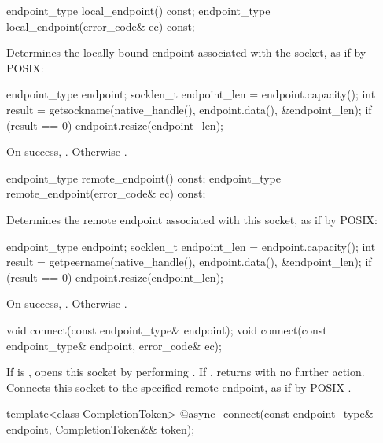 \begin{itemdecl}
endpoint_type local_endpoint() const;
endpoint_type local_endpoint(error_code& ec) const;
\end{itemdecl}

\begin{itemdescr}
\pnum
\effects Determines the locally-bound endpoint associated with the socket, as if by POSIX: 
\begin{codeblock}
endpoint_type endpoint;
socklen_t endpoint_len = endpoint.capacity();
int result = getsockname(native_handle(), endpoint.data(), &endpoint_len);
if (result == 0)
  endpoint.resize(endpoint_len);
\end{codeblock}


\pnum
\returns On success, . Otherwise .
\end{itemdescr}

\begin{itemdecl}
endpoint_type remote_endpoint() const;
endpoint_type remote_endpoint(error_code& ec) const;
\end{itemdecl}

\begin{itemdescr}
\pnum
\effects Determines the remote endpoint associated with this socket, as if by POSIX: 
\begin{codeblock}
endpoint_type endpoint;
socklen_t endpoint_len = endpoint.capacity();
int result = getpeername(native_handle(), endpoint.data(), &endpoint_len);
if (result == 0)
  endpoint.resize(endpoint_len);
\end{codeblock}


\pnum
\returns On success, . Otherwise .
\end{itemdescr}

\begin{itemdecl}
void connect(const endpoint_type& endpoint);
void connect(const endpoint_type& endpoint, error_code& ec);
\end{itemdecl}

\begin{itemdescr}
\pnum
\effects If  is , opens this socket by performing . If , returns with no further action. Connects this socket to the specified remote endpoint, as if by POSIX .
\end{itemdescr}

\begin{itemdecl}
template<class CompletionToken>
  @\DEDUCED@ async_connect(const endpoint_type& endpoint, CompletionToken&& token);
\end{itemdecl}

